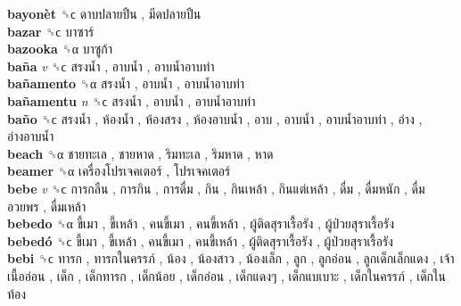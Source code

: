 \textbf{bayonèt} ␝ϲ   ดาบปลายปืน ,  มีดปลายปืน   \\
\textbf{bazar} ␝ϲ   บาซาร์   \\
\textbf{bazooka} ␝α   บาซูก้า   \\
\textbf{baña} \emph{v}  ␝ϲ   สรงน้ำ ,  อาบน้ำ ,  อาบน้ำอาบท่า   \\
\textbf{bañamento} ␝α   สรงน้ำ ,  อาบน้ำ ,  อาบน้ำอาบท่า   \\
\textbf{bañamentu} \emph{n}  ␝ϲ   สรงน้ำ ,  อาบน้ำ ,  อาบน้ำอาบท่า   \\
\textbf{baño} ␝ϲ   สรงน้ำ ,  ห้องน้ำ ,  ห้องสรง ,  ห้องอาบน้ำ ,  อาบ ,  อาบน้ำ ,  อาบน้ำอาบท่า ,  อ่าง ,  อ่างอาบน้ำ   \\
\textbf{beach} ␝α   ชายทะเล ,  ชายหาด ,  ริมทะเล ,  ริมหาด ,  หาด   \\
\textbf{beamer} ␝α   เครื่องโปรเจคเตอร์ ,  โปรเจคเตอร์   \\
\textbf{bebe} \emph{v}  ␝ϲ   การกลืน ,  การกิน ,  การดื่ม ,  กิน ,  กินเหล้า ,  กินแต่เหล้า ,  ดื่ม ,  ดื่มหนัก ,  ดื่มอวยพร ,  ดื่มเหล้า   \\
\textbf{bebedo} ␝α   ขี้เมา ,  ขี้เหล้า ,  คนขี้เมา ,  คนขี้เหล้า ,  ผู้ติดสุราเรื้อรัง ,  ผู้ป่วยสุราเรื้อรัง   \\
\textbf{bebedó} ␝ϲ   ขี้เมา ,  ขี้เหล้า ,  คนขี้เมา ,  คนขี้เหล้า ,  ผู้ติดสุราเรื้อรัง ,  ผู้ป่วยสุราเรื้อรัง   \\
\textbf{bebi} ␝ϲ   ทารก ,  ทารกในครรภ์ ,  น้อง ,  น้องสาว ,  น้องเล็ก ,  ลูก ,  ลูกอ่อน ,  ลูกเด็กเล็กแดง ,  เจ้าเนื้ออ่อน ,  เด็ก ,  เด็กทารก ,  เด็กน้อย ,  เด็กอ่อน ,  เด็กแดงๆ ,  เด็กแบเบาะ ,  เด็กในครรภ์ ,  เด็กในท้อง   \\
